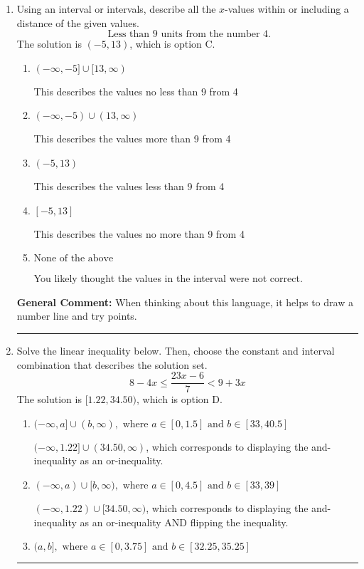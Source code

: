 \documentclass{extbook}[14pt]
\newcommand{\litem}[1]{\item #1

\rule{\textwidth}{0.4pt}}
\begin{document}
\begin{enumerate}
{\begin{enumerate}[label=\Alph*.]
 * Correct option.
\item \( (-\infty, \infty) \)

Corresponds to the variable canceling, which does not happen in this instance.
\end{enumerate}

\textbf{General Comment:} When multiplying or dividing by a negative, flip the sign.
}
\litem{
Using an interval or intervals, describe all the $x$-values within or including a distance of the given values.
\[ \text{ Less than } 9 \text{ units from the number } 4. \]The solution is \( (-5, 13) \), which is option C.\begin{enumerate}[label=\Alph*.]
\item \( (-\infty, -5] \cup [13, \infty) \)

This describes the values no less than 9 from 4
\item \( (-\infty, -5) \cup (13, \infty) \)

This describes the values more than 9 from 4
\item \( (-5, 13) \)

This describes the values less than 9 from 4
\item \( [-5, 13] \)

This describes the values no more than 9 from 4
\item \( \text{None of the above} \)

You likely thought the values in the interval were not correct.
\end{enumerate}

\textbf{General Comment:} When thinking about this language, it helps to draw a number line and try points.
}
\litem{
Solve the linear inequality below. Then, choose the constant and interval combination that describes the solution set.
\[ 8 - 4 x \leq \frac{23 x - 6}{7} < 9 + 3 x \]The solution is \( [1.22, 34.50) \), which is option D.\begin{enumerate}[label=\Alph*.]
\item \( (-\infty, a] \cup (b, \infty), \text{ where } a \in [0, 1.5] \text{ and } b \in [33, 40.5] \)

$(-\infty, 1.22] \cup (34.50, \infty)$, which corresponds to displaying the and-inequality as an or-inequality.
\item \( (-\infty, a) \cup [b, \infty), \text{ where } a \in [0, 4.5] \text{ and } b \in [33, 39] \)

$(-\infty, 1.22) \cup [34.50, \infty)$, which corresponds to displaying the and-inequality as an or-inequality AND flipping the inequality.
\item \( (a, b], \text{ where } a \in [0, 3.75] \text{ and } b \in [32.25, 35.25] \)


\end{enumerate}}
\end{enumerate}
\end{document}
